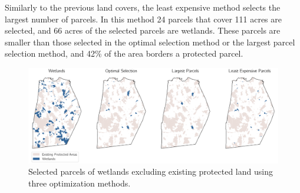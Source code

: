 \documentclass[12pt, stu, floatsintext,table]{apa7}
\begin{document}
Similarly to the previous land covers, the least expensive method selects the largest number of parcels. In this method 24 parcels that cover 111 acres are selected, and 66 acres of the selected parcels are wetlands. These parcels are smaller than those selected in the optimal selection method or the largest parcel selection method, and 42\% of the area borders a protected parcel. 
 
\begin{figure}[hbtp]
    \centering
    \includegraphics[width = \textwidth]{figures/n_61wetland.png}
    \caption{Selected parcels of wetlands excluding existing protected land using three optimization methods.}
\end{figure}
\begin{table}[hbtp]
\caption{Summary of selected wetland parcels. } 
\end{table}
\end{document}
